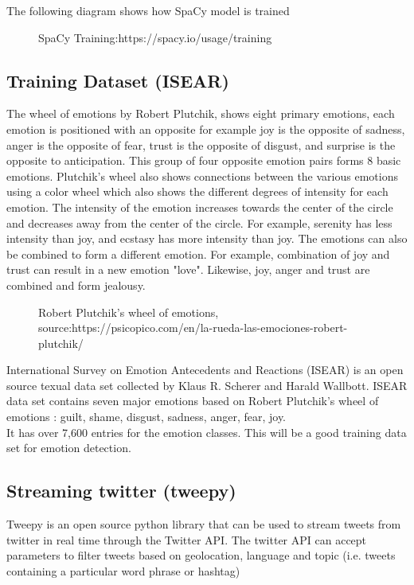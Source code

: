 The following diagram shows how SpaCy model is trained

\begin{figure}[h]
  \centering
  \caption[SpaCy Training]%
  {SpaCy Training:https://spacy.io/usage/training}
  \label{fig:ALAP:sm3}
\end{figure}
 
\clearpage

\subsection{Training Dataset (ISEAR)}

The wheel of emotions by Robert Plutchik, shows eight primary emotions, each emotion is positioned with an opposite for example joy is the opposite of sadness, anger is the opposite of fear, trust is the opposite of disgust, and surprise is the opposite to anticipation. This group of four opposite emotion pairs forms 8 basic emotions. Plutchik's wheel also shows connections between the various emotions using a color wheel which also shows the different degrees of intensity for each emotion. The intensity of the emotion increases towards the center of the circle and decreases away from the center of the circle. For example, serenity has less intensity than joy, and ecstasy has more intensity than joy. The emotions can also be combined to form a different emotion. For example, combination of joy and trust can result in a new emotion "love". Likewise, joy, anger and trust are combined and form jealousy\cite{ref:4}.

\begin{figure}[h]
  \centering
  \caption[Robert Plutchik's wheel of emotions]%
  {Robert Plutchik's wheel of emotions, source:https://psicopico.com/en/la-rueda-las-emociones-robert-plutchik/}
  \label{fig:ALAP:sm3}
\end{figure}

International Survey on Emotion Antecedents and Reactions (ISEAR) is an open source texual data set collected by Klaus R. Scherer and Harald Wallbott. 
ISEAR data set contains seven major emotions based on Robert Plutchik's wheel of emotions : guilt, shame, disgust, sadness, anger, fear,  joy.\\
It has over 7,600 entries for the emotion classes. This will be a good training data set for emotion detection.
\clearpage

\subsection{Streaming twitter (tweepy)}
Tweepy is an open source python library that can be used to stream tweets from twitter in real time through the Twitter API. The twitter API can accept parameters to filter tweets based on geolocation, language and topic (i.e. tweets containing a particular word phrase or hashtag)


